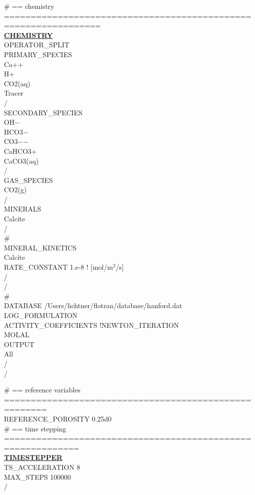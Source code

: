 \noindent
\# == chemistry ================================================================\\
\hyperlink{target_chem}{\bf CHEMISTRY}\\
OPERATOR\_SPLIT\\
PRIMARY\_SPECIES\\
  Ca++\\
  H+\\
  CO2(aq)\\
  Tracer\\
/\\
SECONDARY\_SPECIES\\
  OH$-$\\
  HCO3$-$\\
  CO3$-$$-$\\
  CaHCO3+\\
  CaCO3(aq)\\
/\\
GAS\_SPECIES\\
  CO2(g)\\
/\\
MINERALS\\
  Calcite\\
/\\
\#\\
MINERAL\_KINETICS\\
Calcite\\
RATE\_CONSTANT 1.e-8 ! [mol/m$^2$/s]\\
/\\
/\\
\#\\
DATABASE /Users/lichtner/flotran/database/hanford.dat\\
LOG\_FORMULATION\\
ACTIVITY\_COEFFICIENTS !NEWTON\_ITERATION\\
MOLAL\\
OUTPUT\\
All\\
/\\
/

\noindent
\# == reference variables ======================================================\\
REFERENCE\_POROSITY 0.25d0\\

\noindent
\# == time stepping ============================================================\\
\hyperlink{target_timestep}{\bf TIMESTEPPER}\\
TS\_ACCELERATION 8\\
MAX\_STEPS 100000\\
/

